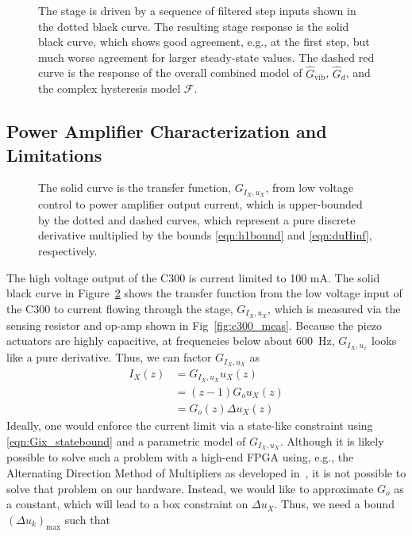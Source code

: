 \documentclass[twocolumn,twoside]{IEEEtran}
\newcommand{\hGv}{\ensuremath{\hat{G}_{\text{vib}}}\xspace}
\begin{document}
\begin{figure}
  
  \caption{The stage is driven by a sequence of filtered step inputs shown in the dotted black curve. The resulting stage response is the solid black curve, which shows good agreement, e.g., at the first step, but much worse agreement for larger steady-state values. The dashed red curve is the response of the overall combined model of $\hGv$, $\hat{G}_{d}$, and the complex hysteresis model $\mathcal{F}$.}
  \label{fig:hyst_resp_dem}
\end{figure}


\subsection{Power Amplifier Characterization and Limitations}\label{sec:powcharct}
\begin{figure}[htbp]
\centering

\caption{ The solid curve is the transfer function, $G_{I_X, u_X}$, from low voltage control to power amplifier output current, which is upper-bounded by the dotted and dashed curves, which represent a pure discrete derivative multiplied by the bounds \eqref{eqn:h1bound} and \eqref{eqn:duHinf}, respectively.}
\label{fig:powTF}
\end{figure}
The high voltage output of the C300 is current limited to 100 mA. The solid black curve in Figure~\ref{fig:powTF} shows the transfer function from the low voltage input of the C300 to current flowing through the stage, $G_{I_X,u_X}$, which is measured via the sensing resistor and op-amp shown in Fig~\ref{fig:c300_meas}. Because the piezo actuators are highly capacitive, at frequencies below about 600~Hz, $G_{I_X,u_x}$ looks like a pure derivative.
Thus, we can factor $G_{I_X,u_X}$ as
\begin{align}
  I_{X}(z) &= G_{I_X,u_X} u_X(z)\label{eqn:Gix_statebound}\\
          & = (z-1) G_o u_X(z)\nonumber\\
          & = G_o(z) \Delta u_X(z) \label{eqn:Gostatebound}
\end{align}
Ideally, one would enforce the current limit via a state-like constraint using \eqref{eqn:Gix_statebound} and a parametric model of $G_{I_X,u_X}$.
Although it is likely possible to solve such a problem with a high-end FPGA using, e.g., the Alternating Direction Method of Multipliers as developed in~\cite{Jerez_Trans_2014}, it is not possible to solve that problem on our hardware. Instead, we would like to approximate $G_o$ as a constant, which will lead to a box constraint on $\Delta u_X$. Thus, we need a bound $(\Delta u_k)_{\text{max}}$ such that
\end{document}
